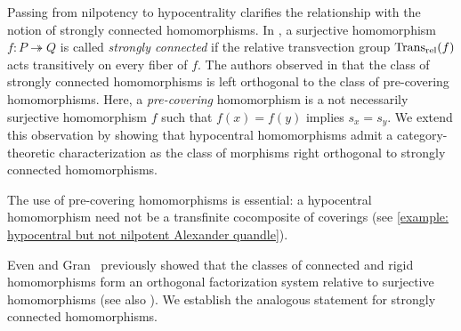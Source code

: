 Passing from nilpotency to hypocentrality clarifies the relationship with the notion of strongly connected homomorphisms.
In \cite[Definition 3.6]{preprint_yuki_tomoki_2026_relativization_of_symmetries_on_quandles}, a surjective homomorphism $f\colon P\twoheadrightarrow Q$ is called \emph{strongly connected} if the relative transvection group $\operatorname{Trans_{rel}}(f)$ acts transitively on every fiber of $f$.
The authors observed in \cite[Proposition 3.21]{preprint_yuki_tomoki_2026_relativization_of_symmetries_on_quandles} that the class of strongly connected homomorphisms is left orthogonal to the class of pre-covering homomorphisms. Here, a \emph{pre-covering} homomorphism is a not necessarily surjective homomorphism $f$ such that $f(x)=f(y)$ implies $s_x=s_y$.
We extend this observation by showing that hypocentral homomorphisms admit a category-theoretic characterization as the class of morphisms right orthogonal to strongly connected homomorphisms.


The use of pre-covering homomorphisms is essential: a hypocentral homomorphism need not be a transfinite cocomposite of coverings (see \cref{example: hypocentral but not nilpotent Alexander quandle}).

Even and Gran~\cite[Proposition 3.2]{even_gran_2014_on_factorization_systems_for_surjective_quandle_homomorphisms} previously showed that the classes of connected and rigid homomorphisms form an orthogonal factorization system relative to surjective homomorphisms (see also \cite[Proposition 2.24]{preprint_yuki_tomoki_2026_relativization_of_symmetries_on_quandles}). 
We establish the analogous statement for strongly connected homomorphisms.

